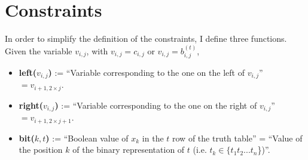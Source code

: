 \documentclass[letterpaper,10pt]{article}
\begin{document}
\section{Constraints}
In order to simplify the definition of the constraints, I define three functions. Given the variable $v_{i,j}$, with $v_{i,j} = c_{i,j}$ or $v_{i,j} = b_{i,j}^{(t)}$,
\begin{itemize}
    \item \textbf{left($v_{i,j}$)} := ``Variable corresponding to the one on the left of $v_{i,j}$'' $ = v_{i+1,2\times j}$.
    \item \textbf{right($v_{i,j}$)} := ``Variable corresponding to the one on the right of $v_{i,j}$'' $ = v_{i+1,2\times j+1}$.
    \item \textbf{bit($k,t$)} := ``Boolean value of $x_k$ in the $t$ row of the truth table'' = ``Value of the position $k$ of the binary representation of $t$ (i.e. $t_k \in \{t_1 t_2 ... t_n$\})''.
\end{itemize}
\end{document}
